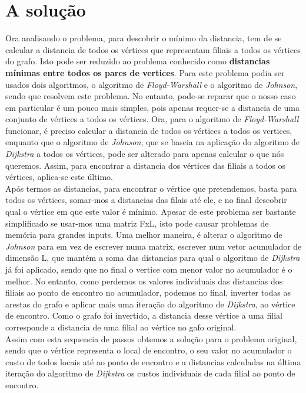 \documentclass[12pt]{article}
\begin{document}
\section{A solução}
Ora analisando o problema, para descobrir o mínimo da distancia, tem de se calcular a distancia de todos os vértices que representam filiais a todos os vértices do grafo. Isto pode ser reduzido ao problema conhecido como \textbf{distancias mínimas entre todos os pares de vertices}. Para este problema podia ser usados dois algoritmos, o algoritmo de \textit{Floyd-Warshall}\cite{Floyd:1962:A9S:367766.368168} e o algoritmo de \textit{Johnson}\cite{Johnson:1977:EAS:321992.321993}, sendo que resolvem este problema. No entanto, pode-se reparar que o nosso caso em particular é um pouco mais simples, pois apenas requer-se a distancia de uma conjunto de vértices a todos os vértices. Ora, para o algoritmo de \textit{Floyd-Warshall} funcionar, é preciso calcular a distancia de todos os vértices a todos os vertices, enquanto que o algoritmo de \textit{Johnson}, que se baseia na aplicação do algoritmo de \textit{Dijkstra}\cite{Dijkstra} a todos os vértices, pode ser alterado para apenas calcular o que nós queremos. Assim, para encontrar a distancia dos vértices das filiais a todos os vértices, aplica-se este último.\\
Após termos as distancias, para encontrar o vértice que pretendemos, basta para todos os vértices, somar-mos a distancias das filais até ele, e no final descobrir qual o vértice em que este valor é mínimo. Apesar de este problema ser bastante simplificado se usar-mos uma matriz FxL, isto pode causar problemas de memória para grandes inputs. Uma melhor maneira, é alterar o algoritmo de \textit{Johnson} para em vez de escrever numa matrix, escrever num vetor acumulador de dimensão L, que mantém a soma das distancias para qual o algoritmo de \textit{Dijkstra} já foi aplicado, sendo que no final o vertice com menor valor no acumulador é o melhor. No entanto, como perdemos os valores individuais das distancias dos filiais ao ponto de encontro no acumulador, podemos no final, inverter todas as arestas do grafo e aplicar mais uma iteração do algoritmo de \textit{Dijkstra}, ao vértice de encontro. Como o grafo foi invertido, a distancia desse vértice a uma filial corresponde a distancia de uma filial ao vértice no gafo original. \\
\indent Assim com esta sequencia de passos obtemos a solução para o problema original, sendo que o vértice representa o local de encontro, o seu valor no acumulador o custo de todos locais até ao ponto de encontro e a distancias calculadas na última iteração do algoritmo de \textit{Dijkstra} os custos individuais de cada filial ao ponto de encontro.
\end{document}

